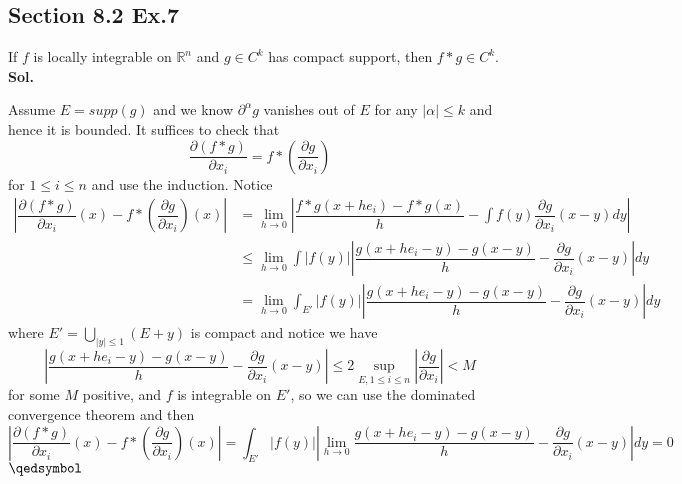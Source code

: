 \documentclass[lang=en,11pt,a4paper,citestyle =authoryear]{elegantpaper}
\newcommand{\prvd}{$\hfill \qedsymbol$}
\newcommand{\R}{\mathbb{R}}
\begin{document}
\subsection*{Section 8.2 Ex.7} 
If $f$ is locally integrable on $\R^n$ and $g\in C^k$ has compact support, then $f*g \in C^k$.
\vspace{0.5em}\\
\textbf{Sol.} \par
Assume $E = supp(g)$ and we know $\partial^{\alpha} g$ vanishes out of $E$ for any $|\alpha|\leq k$ and hence it is bounded. It suffices to check that
\[
\dfrac{\partial (f*g)}{\partial x_i} = f*(\dfrac{\partial g}{\partial x_i})
\]
for $1\leq i \leq n$ and use the induction. Notice
\[
\begin{aligned}
|\dfrac{\partial (f*g)}{\partial x_i}(x) - f*(\dfrac{\partial g}{\partial x_i})(x)| &= \lim_{h\to 0}|\dfrac{f*g(x+he_i)-f*g(x)}{h} - \int f(y)\dfrac{\partial g}{\partial x_i}(x-y) dy| \\
&\leq \lim_{h\to 0}\int |f(y)||\dfrac{g(x+he_i-y)-g(x-y)}{h} -\dfrac{\partial g}{\partial x_i}(x-y)| dy \\
&= \lim_{h\to 0}\int_{E'} |f(y)||\dfrac{g(x+he_i-y)-g(x-y)}{h} -\dfrac{\partial g}{\partial x_i}(x-y)| dy
\end{aligned}
\]
where $E' = \bigcup_{|y|\leq 1}(E+y)$ is compact and notice we have
\[
|\dfrac{g(x+he_i-y)-g(x-y)}{h} -\dfrac{\partial g}{\partial x_i}(x-y)| \leq 2\sup_{E, 1\leq i\leq n} |\dfrac{\partial g}{\partial x_i}| < M
\]
for some $M$ positive, and $f$ is integrable on $E'$, so we can use the dominated convergence theorem and then
\[
|\dfrac{\partial (f*g)}{\partial x_i}(x) - f*(\dfrac{\partial g}{\partial x_i})(x)| = \int_{E'} |f(y)||\lim_{h\to 0}\dfrac{g(x+he_i-y)-g(x-y)}{h} -\dfrac{\partial g}{\partial x_i}(x-y)| dy = 0
\]
\prvd
\vspace{0.5em}
\end{document}
